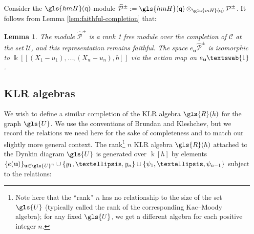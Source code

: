 \documentclass[10pt]{article}
\newtheorem{lemma}[theorem]{Lemma}
\theoremstyle{definition}
\newcommand{\pq}{\mathsf{q}}
\newcommand{\hone}{\text{\textswab{1}}}
\newcommand{\K}{\Bbbk}%
\newcommand{\Bu}{\mathbf{u}}
\newcommand{\cP}{\mathcal{P}}
\newcommand{\hmH}{\gls{hmH}}
\newcommand{\hcP}{\widehat{\cP}}
\newcommand\llbracket{[\![}
\newcommand\rrbracket{]\!]}
\begin{document}
Consider the $\hmH(\pq)$-module $\hcP^\pm :=\hmH(\pq)
\otimes_{\gls{mH}(\pq)}\cP^\pm$. It follows from Lemma
\ref{lem:faithful-completion} that:
\begin{lemma}\label{lem:Hecke-P}
 The module $\hcP^\pm$ is a rank 1 free module over the completion
 of $\mathcal{C} $ at the set $\mathcal{U}$, and this
 representation remains faithful. The space $e_{\Bu}\hcP^\pm $ is isomorphic to
$\K\llbracket (X_1-{u_1}),\dots, (X_n-{u_n}),h\rrbracket $ via the action map on
$e_{\Bu}\hone$.
 \end{lemma}

\subsection{KLR algebras}

We wish to define a similar completion of the KLR algebra $\gls{R}(h)$ for the
graph $\gls{U}$. We use the conventions of Brundan and Kleshchev, but we
record the relations we need here for the sake of completeness and to
match our slightly more general context. The rank\footnote{Note here
 that the ``rank'' $n$ has no relationship to the size of the set $\gls{U}$
(typically called the rank of the corresponding Kac--Moody algebra);
for any fixed $\gls{U}$, we get a different algebra for each positive
integer $n$.} $n$ KLR algebra $\gls{R}(h)$ attached to the Dynkin
diagram $\gls{U}$ is
generated over $\K[h]$ 
by elements $\{e(\Bu)\}_{\Bu\in \gls{U}^n}\cup \{y_1,\dots, y_n\}\cup \{\psi_1,\dots, \psi_{n-1}\}$
subject to the relations:
\end{document}
